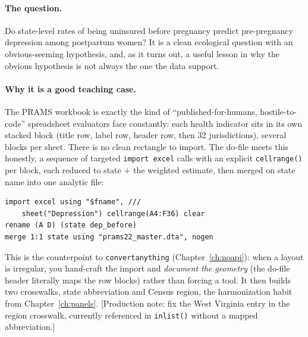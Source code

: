 \documentclass[
    a4paper,
    fontsize=10pt,
    twoside=true,
    numbers=noenddot,
]{kaobook}
\begin{document}
\paragraph{The question.} Do state-level rates of being uninsured before pregnancy predict pre-pregnancy depression among postpartum women? It is a clean ecological question with an obvious-seeming hypothesis, and, as it turns out, a useful lesson in why the obvious hypothesis is not always the one the data support.

\paragraph{Why it is a good teaching case.} The PRAMS workbook is exactly the kind of \enquote{published-for-humans, hostile-to-code} spreadsheet evaluators face constantly: each health indicator sits in its own stacked block (title row, label row, header row, then 32 jurisdictions), several blocks per sheet. There is no clean rectangle to import. The do-file meets this honestly, a sequence of targeted \texttt{import excel} calls with an explicit \texttt{cellrange()} per block, each reduced to state $+$ the weighted estimate, then merged on state name into one analytic file:
{\footnotesize
\begin{verbatim}
import excel using "$fname", ///
    sheet("Depression") cellrange(A4:F36) clear
rename (A D) (state dep_before)
merge 1:1 state using "prams22_master.dta", nogen
\end{verbatim}
}
This is the counterpoint to \texttt{convertanything} (Chapter~\ref{ch:noapi}): when a layout is irregular, you hand-craft the import and \emph{document the geometry} (the do-file header literally maps the row blocks) rather than forcing a tool. It then builds two crosswalks, state abbreviation and Census region, the harmonization habit from Chapter~\ref{ch:panels}. [Production note: fix the West Virginia entry in the region crosswalk, currently referenced in \texttt{inlist()} without a mapped abbreviation.]
\end{document}

